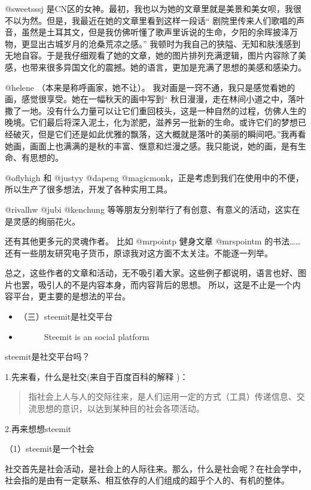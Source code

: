 \documentclass[]{ctexbook}
\providecommand{\tightlist}{%
  \setlength{\itemsep}{0pt}\setlength{\parskip}{0pt}}
\begin{document}
@sweetsssj 是CN区的女神。最初，我也以为她的文章里就是美景和美女呗，我很不以为然。但是，我最近在她的文章里看到这样一段话`` 剧院里传来人们歌唱的声音，虽然是土耳其文，但是我仿佛听懂了歌声里诉说的生命，夕阳的余晖披泽万物，更显出古城岁月的沧桑荒凉之感。'' 我顿时为我自己的狭隘、无知和肤浅感到无地自容。于是我仔细观看了她的文章，她的图片排列充满逻辑，图片内容除了美感，也带来很多异国文化的震撼。她的语言，更加是充满了思想的美感和感染力。

@helene （本来是称呼画家，她不让）。 我对画是一窍不通，我只是感觉看她的画，感觉很享受。她在一幅秋天的画中写到`` 秋日漫漫，走在林间小道之中，落叶撒了一地。没有什么力量可以让它们重回枝头，这是一种自然的过程，仿佛人生的晚境。它们最后将深入泥土，化为淤肥，滋养另一批新的生命。或许它们的梦想已经破灭，但是它们还是如此优雅的飘落，这大概就是落叶的美丽的瞬间吧。''我再看她画，画面上也满满的是秋的丰富、惬意和烂漫之感。我只能说，她的画，是有生命、有思想的。

@oflyhigh 和 @justyy @dapeng @magicmonk，正是考虑到我们在使用中的不便，所以生产了很多想法，开发了各种实用工具。

@rivalhw @jubi @kenchung 等等朋友分别举行了有创意、有意义的活动，这实在是灵感的绚丽花火。

还有其他更多元的灵魂作者。 比如 @mrpointp 健身文章 @mrspointm 的书法\ldots{}\ldots{}还有一些朋友研究电子货币，原谅我对这方面不太关注。不能逐一列举。

总之，这些作者的文章和活动，无不吸引着大家。这些例子都说明，语言也好、图片也罢，吸引人的不是内容本身，而内容背后的思想。
所以，这是不止是一个内容平台，更主要的是想法的平台。

\begin{itemize}
\tightlist
\item
  （三）steemit是社交平台
\item
  　　　Steemit is an social platform
\end{itemize}

steemit是社交平台吗？

1.先来看，什么是社交(来自于百度百科的解释 )：

\begin{quote}
指社会上人与人的交际往来，是人们运用一定的方式（工具）传递信息、交流思想的意识，以达到某种目的社会各项活动。
\end{quote}

2.再来想想steemit

（1）steemit是一个社会

社交首先是社会活动，是社会上的人际往来。那么，什么是社会呢？在社会学中，社会指的是由有一定联系、相互依存的人们组成的超乎个人的、有机的整体。
\end{document}
